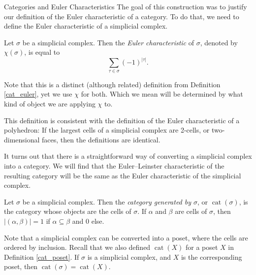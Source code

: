 \documentclass[12pt]{pom_thesis}
\DeclareMathOperator{\cat}{cat}
\begin{document}
\begin{chapter}{Categories and Euler Characteristics}
The goal of this construction was to justify our definition of the Euler characteristic of a category. To do that, we need to define the Euler characteristic of a simplicial complex.
\begin{defn}
Let $\sigma$ be a simplicial complex. Then the \emph{Euler characteristic} of $\sigma$, denoted by $\chi(\sigma)$, is equal to
\[
\sum_{\tau \in \sigma}(-1)^{|\tau|}.
\]
\end{defn}
Note that this is a distinct (although related) definition from Definition \ref{cat_euler}, yet we use $\chi$ for both. Which we mean will be determined by what kind of object we are applying $\chi$ to. 

This definition is consistent with the definition of the Euler characteristic of a polyhedron: If the largest cells of a simplicial complex are 2-cells, or two-dimensional faces, then the definitions are identical. 

It turns out that there is a straightforward way of converting a simplicial complex into a category. We will find that the Euler--Leinster characteristic of the resulting category will be the same as the Euler characteristic of the simplicial complex. 
\begin{defn}
Let $\sigma$ be a simplicial complex. Then the \emph{category generated by $\sigma$}, or $\cat(\sigma)$, is the category whose objects are the cells of $\sigma$. If $\alpha$ and $\beta$ are cells of $\sigma$, then $|(\alpha, \beta)| = 1$ if $\alpha \subseteq \beta$ and 0 else.
\end{defn}
Note that a simplicial complex can be converted into a poset, where the cells are ordered by inclusion. Recall that we also defined $\cat(X)$ for a poset $X$ in Definition \ref{cat_poset}. If $\sigma$ is a simplicial complex, and $X$ is the corresponding poset, then $\cat(\sigma) = \cat(X)$.


\end{chapter}
\end{document}
